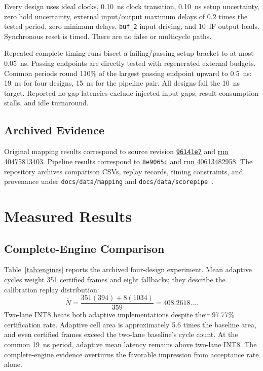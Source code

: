 Every design uses ideal clocks, 0.10~ns clock transition, 0.10~ns setup uncertainty, zero hold uncertainty, external input/output maximum delays of $0.2$ times the tested period, zero minimum delays, \texttt{buf\_2} input driving, and 10~fF output loads. Synchronous reset is timed. There are no false or multicycle paths.

Repeated complete timing runs bisect a failing/passing setup bracket to at most 0.05~ns. Passing endpoints are directly tested with regenerated external budgets. Common periods round 110\% of the largest passing endpoint upward to 0.5~ns: 19~ns for four designs, 15~ns for the pipeline pair. All designs fail the 10~ns target. Reported no-gap latencies exclude injected input gaps, result-consumption stalls, and idle turnaround.

\subsection{Archived Evidence}
Original mapping results correspond to source revision \href{https://github.com/jrmywm/FlexMAC/commit/96141e7767723cfd53e6830a948e46bef05687d8}{\texttt{96141e7}} and \href{https://github.com/jrmywm/FlexMAC/actions/runs/40475813403}{run 40475813403}. Pipeline results correspond to \href{https://github.com/jrmywm/FlexMAC/commit/8e9065cb147d38b66423997e6d960a7239d8f5e9}{\texttt{8e9065c}} and \href{https://github.com/jrmywm/FlexMAC/actions/runs/40613482958}{run 40613482958}. The repository archives comparison CSVs, replay records, timing constraints, and provenance under \texttt{docs/data/mapping} and \texttt{docs/data/scorepipe}~\cite{flexmac}.

\section{Measured Results}
\subsection{Complete-Engine Comparison}
Table~\ref{tab:engines} reports the archived four-design experiment. Mean adaptive cycles weight 351 certified frames and eight fallbacks; they describe the calibration replay distribution:
\begin{equation}
\overline{N}=\frac{351(394)+8(1034)}{359}=408.2618\ldots.
\end{equation}
Two-lane INT8 beats both adaptive implementations despite their 97.77\% certification rate. Adaptive cell area is approximately 5.6 times the baseline area, and even certified frames exceed the two-lane baseline's cycle count. At the common 19~ns period, adaptive mean latency remains above two-lane INT8. The complete-engine evidence overturns the favorable impression from acceptance rate alone.

